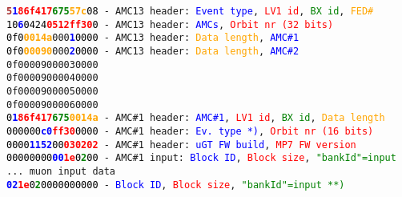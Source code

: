 \texttt{\textcolor{brown}{\textbf{5}}\textcolor{blue}{\textbf{1}}\textcolor{red}{\textbf{86f417}}\textcolor{green}{\textbf{675}}\textcolor{orange}{\textbf{57c}}\textcolor{black}{08} - AMC13 header: \textcolor{blue}{Event type}, \textcolor{red}{LV1 id}, \textcolor{green}{BX id}, \textcolor{orange}{FED\#}}\\
\texttt{\textcolor{black}{10}\textcolor{blue}{\textbf{6}}\textcolor{black}{0424}\textcolor{red}{\textbf{0512ff30}}\textcolor{black}{0} - AMC13 header: \textcolor{blue}{AMCs}, \textcolor{red}{Orbit nr (32 bits)}}\\
\texttt{\textcolor{black}{0f0}\textcolor{orange}{\textbf{0014a}}\texttt{000}\textcolor{blue}{\textbf{1}}\textcolor{black}{0000} - AMC13 header: \textcolor{orange}{Data length}, \textcolor{blue}{AMC\#1}}\\
\texttt{\textcolor{black}{0f0}\textcolor{orange}{\textbf{00090}}\texttt{000}\textcolor{blue}{\textbf{2}}\textcolor{black}{0000} - AMC13 header: \textcolor{orange}{Data length}, \textcolor{blue}{AMC\#2}}\\
\texttt{0f00009000030000}\\
\texttt{0f00009000040000}\\
\texttt{0f00009000050000}\\
\texttt{0f00009000060000}\\
\texttt{\textcolor{black}{0}\textcolor{blue}{\textbf{1}}\textcolor{red}{\textbf{86f417}}\textcolor{green}{\textbf{675}}\textcolor{orange}{\textbf{0014a}} - AMC\#1 header: \textcolor{blue}{AMC\#1}, \textcolor{red}{LV1 id}, \textcolor{green}{BX id}, \textcolor{orange}{Data length}}\\
\texttt{\textcolor{black}{000000}\textcolor{blue}{\textbf{c0}}\textcolor{red}{\textbf{ff30}}\textcolor{black}{0000} - AMC\#1 header: \textcolor{blue}{Ev. type *)}, \textcolor{red}{Orbit nr (16 bits)}}\\
\texttt{\textcolor{black}{0000}\textcolor{blue}{\textbf{1152}}\textcolor{black}{00}\textcolor{red}{\textbf{030202}} - AMC\#1 header: \textcolor{blue}{uGT FW build}, \textcolor{red}{MP7 FW version}}\\
\texttt{\textcolor{black}{00000000}\textcolor{blue}{\textbf{00}}\textcolor{red}{\textbf{1e}}\textcolor{black}{0}\textcolor{green}{\textbf{2}}\textcolor{black}{00} - AMC\#1 input: \textcolor{blue}{Block ID}, \textcolor{red}{Block size}, \textcolor{green}{"bankId"=input}}\\
\texttt{... muon input data}\\
\texttt{\textcolor{blue}{\textbf{02}}\textcolor{red}{\textbf{1e}}\textcolor{black}{0}\textcolor{green}{\textbf{2}}\textcolor{black}{0000000000} - \textcolor{blue}{Block ID}, \textcolor{red}{Block size}, \textcolor{green}{"bankId"=input **)}}\\
